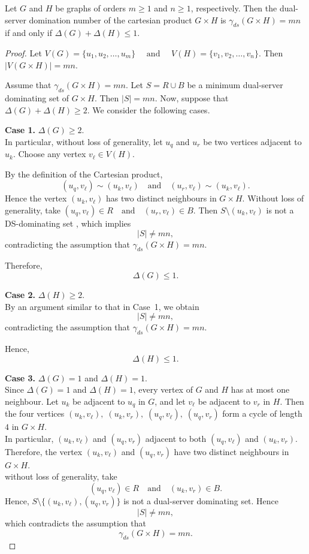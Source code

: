 \documentclass[10pt,a4paper]{amsart}
\begin{document}
\begin{theorem}
Let $G$ and $H$ be graphs of orders $m\ge1$ and $n\ge1$, respectively. Then the dual-server domination number of the cartesian product  $G\times H $ is 
$\gamma_{ds}(G\times H)=mn$
if and only if $
\Delta(G)+\Delta(H)\le1$.
\end{theorem}

\begin{proof}
Let $
V(G)=\{u_1,u_2,\ldots,u_m\} \quad \text{ and }\quad
V(H)=\{v_1,v_2,\ldots,v_n\}$.
Then $
|V(G\times H)|=mn$.

Assume that $\gamma_{ds}(G\times H)=mn$. Let $S=R\cup B $
be a minimum dual-server dominating set of $G\times H$. Then $|S|=mn$. Now, suppose that  $\Delta(G)+\Delta(H)\ge2$.
We consider the following cases.

\textbf{Case 1.} $\Delta(G)\ge2$.\\
In particular, without loss of generality, let  $u_q$ and $u_r$ be two vertices adjacent to $u_k$. Choose any vertex $v_\ell\in V(H)$.

By the definition of the Cartesian product,
\[
(u_q,v_\ell)\sim(u_k,v_\ell)
\quad\text{and}\quad
(u_r,v_\ell)\sim(u_k,v_\ell).
\]
Hence the vertex $(u_k,v_\ell)$ has two distinct neighbours in
$G\times H$.
Without loss of generality, take
$
(u_q,v_\ell)\in R
\quad\text{and}\quad
(u_r,v_\ell)\in B.
$ Then $S \setminus (u_k,v_\ell) $  is not a DS-dominating set
, which implies
\[
|S| \neq mn,
\]
contradicting the assumption that $
\gamma_{ds}(G\times H)=mn $.

Therefore,
\[
\Delta(G)\le1.
\]

\textbf{Case 2.} $\Delta(H)\ge2$.\\
By an argument similar to that in Case~1, we obtain
\[
|S|\neq mn,
\]
contradicting the assumption that $
\gamma_{ds}(G\times H)=mn $.

Hence,
\[
\Delta(H)\le1.
\]

\textbf{Case 3.} $\Delta(G)=1$ and $\Delta(H)=1$.\\
Since $\Delta(G)=1$ and $\Delta(H)=1$, every vertex of $G$ and $H$ has at
most one neighbour.
Let $u_k$ be adjacent to $u_q$ in $G$, and let $v_\ell$ be adjacent to
$v_r$ in $H$. Then the four vertices $
(u_k,v_\ell),\;
(u_k,v_r),\;
(u_q,v_\ell),\;
(u_q,v_r)$
form a cycle of length $4$ in $G\times H$.\\
In particular, $(u_k,v_\ell)$ and $(u_q,v_r)$  adjacent to both
$(u_q,v_\ell)$ and $(u_k,v_r)$. Therefore, the vertex $(u_k,v_\ell)$  and $(u_q,v_r) $ have
two distinct neighbours in $G\times H$.\\
without loss of generality, take
\[
(u_q,v_\ell)\in R
\quad\text{and}\quad
(u_k,v_r)\in B.
\]
Hence, $
S\setminus\{(u_k,v_\ell),(u_q,v_r)\}
$ is not a dual-server dominating set. Hence 
\[
|S| \neq mn,
\]
which contradicts the assumption that
\[
\gamma_{ds}(G\times H)=mn.
\]


\end{proof}
\end{document}
